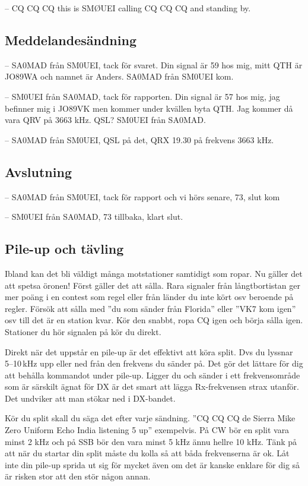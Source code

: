 -- CQ CQ CQ this is SMØUEI calling CQ CQ CQ and standing by.

\subsection{Meddelandesändning}

-- SA0MAD från SM0UEI, tack för svaret. Din signal är 59 hos mig, mitt QTH är
JO89WA och namnet är Anders. SA0MAD från SM0UEI kom.

-- SM0UEI från SA0MAD, tack för rapporten. Din signal är 57 hos mig, jag
befinner mig i JO89VK men kommer under kvällen byta QTH. Jag kommer då vara QRV
på 3663 kHz. QSL? SM0UEI från SA0MAD.

-- SA0MAD från SM0UEI, QSL på det, QRX 19.30 på frekvens 3663 kHz.

\subsection{Avslutning}

-- SA0MAD från SM0UEI, tack för rapport och vi hörs senare, 73, slut kom

-- SM0UEI från SA0MAD, 73 tillbaka, klart slut.

\subsection{Pile-up och tävling}

Ibland kan det bli väldigt många motstationer samtidigt som ropar. Nu
gäller det att spetsa öronen! Först gäller det att sålla. Rara
signaler från långtbortistan ger mer poäng i en contest som regel
eller från länder du inte kört osv beroende på regler. Försök att
sålla med ''du som sänder från Florida'' eller ''VK7 kom igen'' osv
till det är en station kvar. Kör den snabbt, ropa CQ igen och börja
sålla igen. Stationer du hör signalen på kör du direkt.

Direkt när det uppstår en pile-up är det effektivt att köra split. Dvs
du lyssnar 5--10\,kHz upp eller ned från den frekvens du sänder
på. Det gör det lättare för dig att behålla kommandot under
pile-up. Ligger du och sänder i ett frekvensområde som är särskilt
ägnat för DX är det smart att lägga Rx-frekvensen strax utanför. Det
undviker att man stökar ned i DX-bandet.

Kör du split skall du säga det efter varje sändning. ''CQ CQ CQ de Sierra Mike
Zero Uniform Echo India listening 5 up'' exempelvis. På CW bör en split vara
minst 2 kHz och på SSB bör den vara minst 5 kHz ännu hellre 10 kHz. Tänk på att
när du startar din split måste du kolla så att båda frekvenserna är ok. Låt inte
din pile-up sprida ut sig för mycket även om det är kanske enklare för dig så är
risken stor att den stör någon annan.

